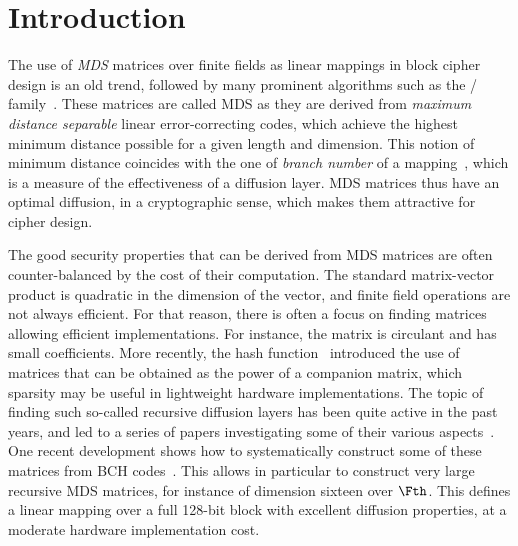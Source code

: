 \section{Introduction}

The use of \emph{MDS} matrices over finite fields as linear mappings in block cipher design is an old trend, followed by many prominent algorithms such as the \AES/\rijndael{} family~\cite{aes}.
These matrices are called MDS as they are derived from \emph{maximum distance separable} linear error-correcting codes, which achieve the highest minimum distance possible
for a given length and dimension. This notion of minimum distance coincides with the one of \emph{branch number} of a mapping~\cite{aes}, which is a measure of the effectiveness
of a diffusion layer.
MDS matrices thus have an optimal diffusion, in a cryptographic sense, which makes them attractive for cipher design.

The good security properties that can be derived from MDS matrices are often counter-balanced by the cost of their computation. The standard matrix-vector product is
quadratic in the dimension of the vector, and finite field operations are not always efficient.
For that reason, there is often a focus on finding matrices allowing efficient implementations. For instance, the \AES{} matrix is circulant and has small coefficients.
More recently, the \photon{} hash function~\cite{photon} introduced the use of matrices that can be obtained as the power of a companion matrix, which sparsity may be useful in
lightweight hardware implementations. The topic of finding such so-called recursive diffusion layers has been quite active in the past years, and led to a series
of papers investigating some of their various aspects~\cite{recursive1,recursive2,recursive3}. One recent development shows how to systematically construct some of these matrices
from BCH codes~\cite{recursive4}. This allows in particular to construct very large recursive MDS matrices, for instance of dimension sixteen over $\Fth$. This defines a linear mapping over
a full 128-bit block with excellent diffusion properties, at a moderate hardware implementation cost.

